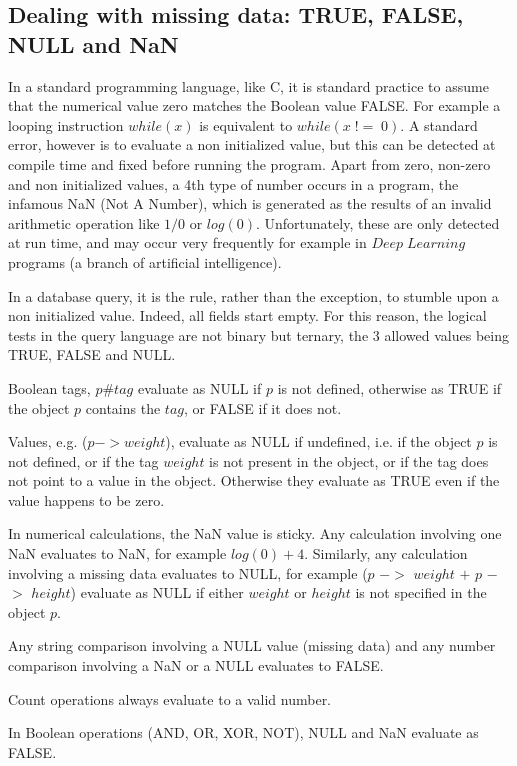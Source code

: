 \documentclass[11pt]{article}
\begin{document}
\subsection{Dealing with missing data: TRUE, FALSE, NULL and NaN}

In a standard programming language, like C, it is standard practice to
assume that the numerical value zero matches the Boolean value FALSE.
For example a looping instruction $while(x)$ is equivalent
to $while(x\;!=\;0)$. A standard error, however is to evaluate
a non initialized value, but this can be detected at compile time and fixed
before running the program. Apart from zero, non-zero and non initialized values,
a 4th type of number occurs in a program, the infamous NaN (Not A Number), which is generated
as the results of an invalid arithmetic operation like $1/0$ or $log(0)$.
Unfortunately, these are only detected at run time, and may occur very frequently for
example in $Deep\;Learning$ programs (a branch of artificial intelligence).

In a database query, it is the rule, rather than the exception, to stumble
upon a non initialized value. Indeed, all fields start empty. For this
reason, the logical tests in the query language are not binary but ternary,
the 3 allowed values being TRUE, FALSE and NULL. 

Boolean tags, $p\#tag$ evaluate as NULL if $p$ is not defined, otherwise as TRUE
if the object $p$ contains the $tag$, or FALSE if it does not.

Values, e.g. ($p$$-$$>$$weight$), evaluate as NULL if undefined, i.e. if the object $p$ is not defined, 
or if the tag $weight$ is not present in the object, or if the tag does not point to a value in the object.
Otherwise they evaluate as TRUE even if the value happens to be zero.

In numerical calculations, the NaN value is sticky. Any calculation involving one NaN
evaluates to NaN, for example $log(0) + 4$. Similarly, any calculation
involving a missing data evaluates to NULL, for example ($p$ $-$$>$ $weight$ $+$ $p$ $-$$>$ $height$)
evaluate as NULL
if either $weight$ or $height$ is not specified in the object $p$.

Any string comparison involving a NULL value (missing data) and any number comparison
involving a NaN or a NULL evaluates to FALSE.

Count operations always evaluate to a valid number.

In Boolean operations (AND, OR, XOR, NOT), NULL and NaN evaluate as FALSE.
\end{document}
